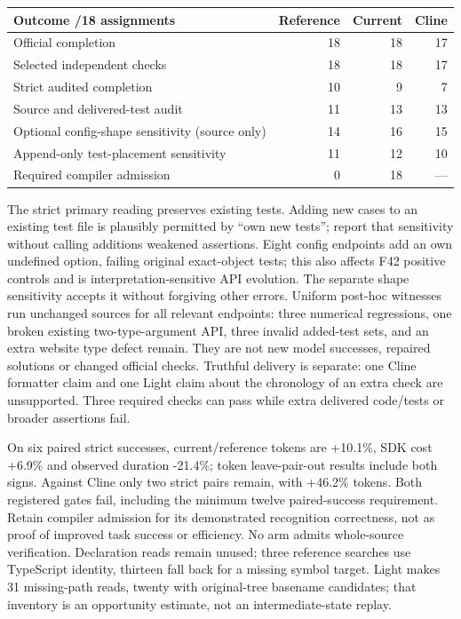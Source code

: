 \documentclass[11pt,a4paper]{article}
\begin{document}
\begin{center}\begin{tabular}{lrrr}\toprule
Outcome /18 assignments & Reference & Current & Cline\\\midrule
Official completion &18&18&17\\
Selected independent checks &18&18&17\\
Strict audited completion &10&9&7\\
Source and delivered-test audit &11&13&13\\
Optional config-shape sensitivity (source only) &14&16&15\\
Append-only test-placement sensitivity &11&12&10\\
Required compiler admission &0&18&---\\\bottomrule
\end{tabular}\end{center}
The strict primary reading preserves existing tests. Adding new cases to an
existing test file is plausibly permitted by ``own new tests''; report that
sensitivity without calling additions weakened assertions. Eight config
endpoints add an own undefined option, failing original exact-object tests;
this also affects F42 positive controls and is interpretation-sensitive API
evolution. The separate shape sensitivity accepts it without forgiving other
errors. Uniform post-hoc witnesses run unchanged sources for all relevant
endpoints: three numerical regressions, one broken existing two-type-argument
API, three invalid added-test sets, and an extra website type defect remain.
They are not new model successes, repaired solutions or changed official checks.
Truthful delivery is separate: one Cline formatter claim and one Light claim
about the chronology of an extra check are unsupported. Three required checks
can pass while extra delivered code/tests or broader assertions fail.

On six paired strict successes, current/reference tokens are +10.1\%, SDK cost
+6.9\% and observed duration -21.4\%; token leave-pair-out results include both
signs. Against Cline only two strict pairs remain, with +46.2\% tokens.
Both registered gates fail, including the minimum twelve paired-success
requirement. Retain compiler admission for its demonstrated recognition
correctness, not as proof of improved task success or efficiency. No arm admits
whole-source verification. Declaration reads remain unused; three reference
searches use TypeScript identity, thirteen fall back for a missing symbol target.
Light makes 31 missing-path reads, twenty with original-tree basename candidates;
that inventory is an opportunity estimate, not an intermediate-state replay.
\end{document}
